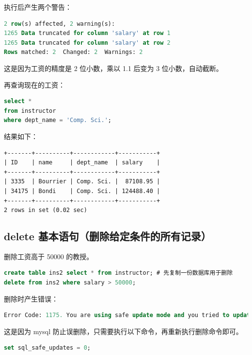 \documentclass{article}
\begin{document}
执行后产生两个警告：

\begin{lstlisting}[language=sql]
2 row(s) affected, 2 warning(s): 
1265 Data truncated for column 'salary' at row 1 
1265 Data truncated for column 'salary' at row 2 
Rows matched: 2  Changed: 2  Warnings: 2
\end{lstlisting}

这是因为工资的精度是 2 位小数，乘以 1.1 后变为 3 位小数，自动截断。


再查询现在的工资：

\begin{lstlisting}[language=sql]
select *
from instructor
where dept_name = 'Comp. Sci.';
\end{lstlisting}

结果如下：

\begin{lstlisting}
+-------+----------+------------+-----------+
| ID    | name     | dept_name  | salary    |
+-------+----------+------------+-----------+
| 3335  | Bourrier | Comp. Sci. |  87108.95 |
| 34175 | Bondi    | Comp. Sci. | 124488.40 |
+-------+----------+------------+-----------+
2 rows in set (0.02 sec)

\end{lstlisting}

\subsection{delete 基本语句（删除给定条件的所有记录）}

删除工资高于 50000 的教授。

\begin{lstlisting}[language=sql]
create table ins2 select * from instructor; # 先复制一份数据库用于删除
delete from ins2 where salary > 50000;
\end{lstlisting}

删除时产生错误：

\begin{lstlisting}[language=sql]
Error Code: 1175. You are using safe update mode and you tried to update a table without a WHERE that uses a KEY column To disable safe mode, toggle the option in Preferences -> SQL Queries and reconnect.
\end{lstlisting}

这是因为 mysql 防止误删除，只需要执行以下命令，再重新执行删除命令即可。

\begin{lstlisting}[language=sql]
set sql_safe_updates = 0;
\end{lstlisting}
\end{document}
